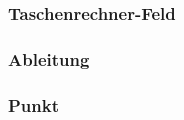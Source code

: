 \documentclass[12pt,a4paper]{article}
\newcommand{\project}{/home/jonas/Dokumente/Java-Projekte/GraphingCalculator/src/main/java/de/jonas/graphingcalculator}
\begin{document}
    \newpage

    \subsubsection{Taschenrechner-Feld}
    

    \newpage

    \subsubsection{Ableitung}
    

    \newpage

    \subsubsection{Punkt}
    
\end{document}
